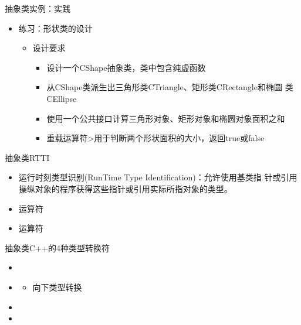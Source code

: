 \begin{frame}[t, fragile]{抽象类}{实例：实践}%
  \stretchon
  \begin{itemize}
  \item 练习：形状类的设计
    \begin{itemize}
    \item 设计要求
      \begin{itemize}
      \item 设计一个CShape抽象类，类中包含纯虚函数
      \item 从CShape类派生出三角形类CTriangle、矩形类CRectangle和椭圆
        类CEllipse
      \item 使用一个公共接口计算三角形对象、矩形对象和椭圆对象面积之和
      \item 重载运算符>用于判断两个形状面积的大小，返回true或false
      \end{itemize}
    \end{itemize}
  \end{itemize}
  \stretchoff
\end{frame}

\begin{frame}[t, fragile]{抽象类}{RTTI}%
  \stretchon
  \begin{itemize}
  \item 运行时刻类型识别(RunTime Type Identification)：允许使用基类指
    针或引用操纵对象的程序获得这些指针或引用实际所指对象的类型。
  \item {}运算符
  \item {}运算符
  \end{itemize}
  \stretchoff
\end{frame}

\begin{frame}[t, fragile]{抽象类}{C++的4种类型转换符}%
  \stretchon
  \begin{itemize}
  \item {}
  \item {}
    \begin{itemize}
    \item 向下类型转换
    \end{itemize}
  \item {}
  \item {}
  \end{itemize}
  \stretchoff
\end{frame}

